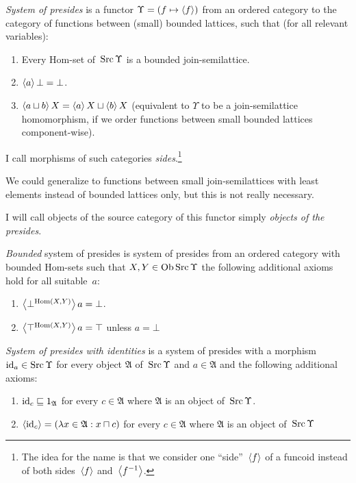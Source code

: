 \begin{defn}
\emph{System of presides} is
a functor $\Upsilon = (f\mapsto\left\langle f\right\rangle)$ from an ordered category
to the category of functions between (small) bounded lattices,
such that (for all relevant variables):
\begin{enumerate}
  \item Every Hom-set of~$\operatorname{Src}\Upsilon$ is a bounded join-semilattice.

  \item $\left\langle a\right\rangle\bot = \bot$.

  \item $\left\langle a \sqcup b\right\rangle X = \left\langle a\right\rangle X \sqcup \left\langle b\right\rangle X$ (equivalent to $\Upsilon$ to be a join-semilattice homomorphism,
    if we order functions between small bounded lattices component-wise).
\end{enumerate}
I call morphisms of such categories \emph{sides}.\footnote{The idea for the name is that we consider one ``side''~$\left\langle f\right\rangle$ of a funcoid instead of both sides~$\left\langle f\right\rangle$ and~$\left\langle f^{-1}\right\rangle$.}
\end{defn}

\begin{rem}
We could generalize to functions between small join-semilattices with least elements instead of bounded lattices only, but this is not really necessary.
\end{rem}

\begin{defn}
I will call objects of the source category of this functor simply \emph{objects of the presides}.
\end{defn}

\begin{defn}
\emph{Bounded} system of presides is system of presides from an ordered category with bounded Hom-sets
such that $X,Y\in\operatorname{Ob}\operatorname{Src}\Upsilon$ the following additional axioms hold for all suitable~$a$:
\begin{enumerate}
  \item $\left\langle \bot^{\operatorname{Hom}(X,Y)}\right\rangle a = \bot$.

  \item $\left\langle \top^{\operatorname{Hom}(X,Y)}\right\rangle a = \top$ unless $a = \bot$
\end{enumerate}
\end{defn}

\begin{defn}
\emph{System of presides with identities} is a system of presides with
a morphism $\operatorname{id}_a\in\operatorname{Src}\Upsilon$ for every object $\mathfrak{A}$ of~$\operatorname{Src}\Upsilon$ and $a\in\mathfrak{A}$
and the following additional axioms:
\begin{enumerate}
  \item $\operatorname{id}_c \sqsubseteq 1_{\mathfrak{A}}$ for every $c \in \mathfrak{A}$
    where $\mathfrak{A}$ is an object of~$\operatorname{Src}\Upsilon$.

  \item $\left\langle \operatorname{id}_c\right\rangle = (\lambda x \in \mathfrak{A}: x \sqcap c)$ for every $c \in \mathfrak{A}$
    where $\mathfrak{A}$ is an object of~$\operatorname{Src}\Upsilon$
\end{enumerate}
\end{defn}

